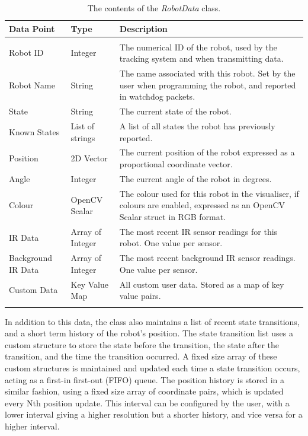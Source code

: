 \begin{longtable}{ l l p{8cm} }
\caption[Robot Data Contents]{The contents of the \textit{RobotData} class.}\\
 \hline
 Data Point & Type & Description\\
 \hline\\
 Robot ID & Integer & The numerical ID of the robot, used by the tracking system and when transmitting data.\\
 Robot Name & String & The name associated with this robot. Set by the user when programming the robot, and reported in watchdog packets. \\
 State & String & The current state of the robot. \\
 Known States & List of strings & A list of all states the robot has previously reported. \\
 Position & 2D Vector & The current position of the robot expressed as a proportional coordinate vector. \\
 Angle & Integer & The current angle of the robot in degrees. \\
 Colour & OpenCV Scalar & The colour used for this robot in the visualiser, if colours are enabled, expressed as an OpenCV Scalar struct in RGB format. \\
 IR Data & Array of Integer & The most recent IR sensor readings for this robot. One value per sensor. \\
 Background IR Data & Array of Integer & The most recent background IR sensor readings. One value per sensor. \\
 Custom Data & Key Value Map & All custom user data. Stored as a map of key value pairs. \\
 
 \label{tab:RobotDataContents}
\end{longtable}

In addition to this data, the class also maintains a list of recent state transitions, and a short term history of the robot's position. The state transition list uses a custom structure to store the state before the transition, the state after the transition, and the time the transition occurred. A fixed size array of these custom structures is maintained and updated each time a state transition occurs, acting as a first-in first-out (FIFO) queue. The position history is stored in a similar fashion, using a fixed size array of coordinate pairs, which is updated every Nth position update. This interval can be configured by the user, with a lower interval giving a higher resolution but a shorter history, and vice versa for a higher interval.

